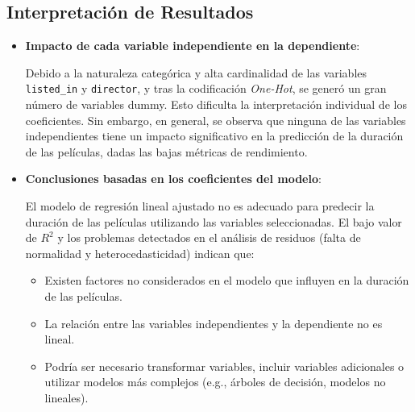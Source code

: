 \documentclass{article}
\begin{document}
\subsection{Interpretación de Resultados}
\begin{itemize}
    \item \textbf{Impacto de cada variable independiente en la dependiente}:

    Debido a la naturaleza categórica y alta cardinalidad de las variables \texttt{listed\_in} y \texttt{director}, y tras la codificación \textit{One-Hot}, se generó un gran número de variables dummy. Esto dificulta la interpretación individual de los coeficientes. Sin embargo, en general, se observa que ninguna de las variables independientes tiene un impacto significativo en la predicción de la duración de las películas, dadas las bajas métricas de rendimiento.

    \item \textbf{Conclusiones basadas en los coeficientes del modelo}:

    El modelo de regresión lineal ajustado no es adecuado para predecir la duración de las películas utilizando las variables seleccionadas. El bajo valor de \( R^2 \) y los problemas detectados en el análisis de residuos (falta de normalidad y heterocedasticidad) indican que:
    \begin{itemize}
        \item Existen factores no considerados en el modelo que influyen en la duración de las películas.
        \item La relación entre las variables independientes y la dependiente no es lineal.
        \item Podría ser necesario transformar variables, incluir variables adicionales o utilizar modelos más complejos (e.g., árboles de decisión, modelos no lineales).
    \end{itemize}
\end{itemize}
\end{document}
